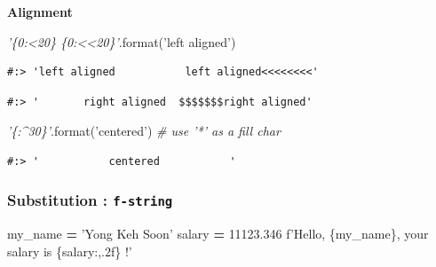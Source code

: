 \documentclass[
]{book}
\newenvironment{Shaded}{\begin{snugshade}}{\end{snugshade}}
\newcommand{\BuiltInTok}[1]{#1}
\newcommand{\CommentTok}[1]{\textcolor[rgb]{0.37,0.37,0.37}{\textit{#1}}}
\newcommand{\FloatTok}[1]{\textcolor[rgb]{0.06,0.06,0.06}{#1}}
\newcommand{\NormalTok}[1]{#1}
\newcommand{\OperatorTok}[1]{\textcolor[rgb]{0.43,0.43,0.43}{\textbf{#1}}}
\newcommand{\SpecialCharTok}[1]{\textcolor[rgb]{0,0,0}{#1}}
\newcommand{\SpecialStringTok}[1]{\textcolor[rgb]{0.5,0.5,0.5}{#1}}
\newcommand{\StringTok}[1]{\textcolor[rgb]{0.5,0.5,0.5}{#1}}
\begin{document}
\textbf{Alignment}

\begin{Shaded}
\begin{Highlighting}[]
\CommentTok{'\{0:<20\}   \{0:<<20\}'}\NormalTok{.}\BuiltInTok{format}\NormalTok{(}\StringTok{'left aligned'}\NormalTok{)}
\end{Highlighting}
\end{Shaded}

\begin{verbatim}
#:> 'left aligned           left aligned<<<<<<<<'
\end{verbatim}

\begin{Shaded}
\end{Shaded}

\begin{verbatim}
#:> '       right aligned  $$$$$$$right aligned'
\end{verbatim}

\begin{Shaded}
\begin{Highlighting}[]
\CommentTok{'\{:^30\}'}\NormalTok{.}\BuiltInTok{format}\NormalTok{(}\StringTok{'centered'}\NormalTok{)  }\CommentTok{# use '*' as a fill char}
\end{Highlighting}
\end{Shaded}

\begin{verbatim}
#:> '           centered           '
\end{verbatim}

\hypertarget{substitution-f-string}{%
\subsubsection{\texorpdfstring{Substitution : \textbf{\texttt{f-string}}}{Substitution : f-string}}\label{substitution-f-string}}

\begin{Shaded}
\begin{Highlighting}[]
\NormalTok{my_name }\OperatorTok{=} \StringTok{'Yong Keh Soon'}
\NormalTok{salary  }\OperatorTok{=} \FloatTok{11123.346}
\SpecialStringTok{f'Hello, }\SpecialCharTok{\{}\NormalTok{my_name}\SpecialCharTok{\}}\SpecialStringTok{, your salary is }\SpecialCharTok{\{}\NormalTok{salary}\SpecialCharTok{:,.2f\}}\SpecialStringTok{ !'}
\end{Highlighting}
\end{Shaded}
\end{document}
